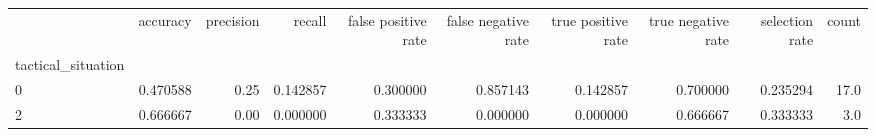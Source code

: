 \begin{tabular}{lrrrrrrrrr}
\toprule
{} &  accuracy &  precision &    recall &  false positive rate &  false negative rate &  true positive rate &  true negative rate &  selection rate &  count \\
tactical\_situation &           &            &           &                      &                      &                     &                     &                 &        \\
\midrule
0                  &  0.470588 &       0.25 &  0.142857 &             0.300000 &             0.857143 &            0.142857 &            0.700000 &        0.235294 &   17.0 \\
2                  &  0.666667 &       0.00 &  0.000000 &             0.333333 &             0.000000 &            0.000000 &            0.666667 &        0.333333 &    3.0 \\
\bottomrule
\end{tabular}
